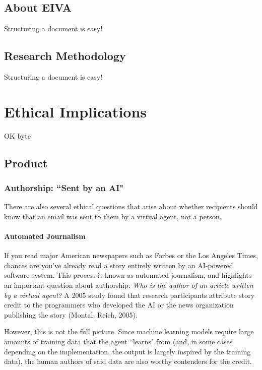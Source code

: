 \documentclass{article}
\begin{document}
\subsection{About EIVA}

Structuring a document is easy!

\subsection{Research Methodology}

Structuring a document is easy!

\section{Ethical Implications}

OK byte

\subsection{Product}

\subsubsection{Authorship: ``Sent by an AI"}

There are also several ethical questions that arise about whether recipients should know that an email was sent to them by a virtual agent, not a person.

\paragraph{Automated Journalism}


If you read major American newspapers such as Forbes or the Los Angeles Times, chances are you’ve already read a story entirely written by an AI-powered software system. This process is known as automated journalism, and highlights an important question about authorship: \emph{Who is the author of an article written by a virtual agent?} A 2005 study found that research participants attribute story credit to the programmers who developed the AI or the news organization publishing the story (Montal, Reich, 2005). 

However, this is not the full picture. Since machine learning models require large amounts of training data that the agent ``learns" from (and, in some cases depending on the implementation, the output is largely inspired by the training data), the human authors of said data are also worthy contenders for the credit.
\end{document}
